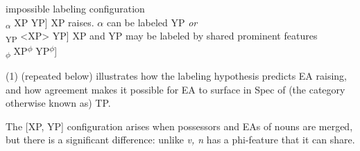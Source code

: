\documentclass[output=paper
,modfonts
,nonflat]{langsci/langscibook}
\begin{document}
\begin{exe}
	\ex 
	\xlist
	\ex impossible labeling configuration\\
	{\lbrack}\textsubscript{$\alpha$} XP YP] 
	\ex XP raises. ${\alpha}$ can be labeled YP  \textit{or}\\
	{\lbrack}\textsubscript{YP} <XP> YP] 
	\ex XP and YP may be labeled by shared prominent features\\
	{\lbrack}\textsubscript{$\phi$} XP\textsuperscript{$\phi$} YP\textsuperscript{$\phi$}] 
	\endxlist
\end{exe}
(1) (repeated below) illustrates how the labeling hypothesis predicts EA raising, and how agreement makes it possible for EA to surface in Spec of (the category otherwise known as) TP.
\begin{comment}
\begin{exe}
\ex
\xlist
	\ex $\alpha$ cannot be labeled\newline
	{\lbrack}$\alpha$ [\textsubscript{DP} the girl] [\textsubscript{vP} \textit{v} [\textsubscript{VP} feed [\textsubscript{DP} the dog]{\rbrack} 
	\ex after EA raising, $\alpha$ labeled vP based on its head v\newline
	{\lbrack}\textsubscript{vP} {\textless}the girl{\textgreater} [\textsubscript{vP} \textit{v} [\textsubscript{VP} feed [\textsubscript{DP} the dog]{\rbrack} 
	\ex ...but first, Agree (T, SU)\newline
	{\lbrack}T\textsubscript{u$\phi$} [\textsubscript{vP} [\textsubscript{DP} the girl\textsubscript{$\phi$}] [\textsubscript{vP} \textit{v} [\textsubscript{VP} feed [\textsubscript{DP} the dog]{\rbrack} 
		\ex shared prominent features label $\phi$P\newline
	{\lbrack}\textsubscript{$\phi$P} [\textsubscript{DP} the girl]\textsuperscript{$\phi$} will\textsuperscript{$\phi$} [\textsubscript{vP} <the girl> \textit{v} [feed the dog]]{\rbrack}  
\endxlist
\end{exe}
\end{comment}
The [XP, YP] configuration arises when possessors and EAs of nouns are merged, but there is a significant difference: unlike \textit{v, n} has a phi-feature that it can share. 
\end{document}
